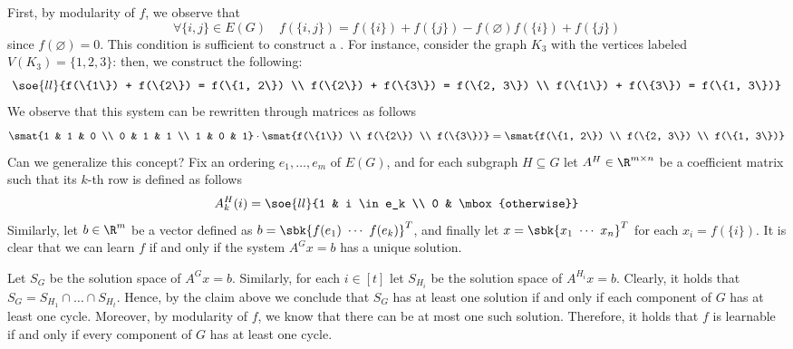 \documentclass[a4paper, 12pt]{report}
\begin{document}
{\begin{enumerate}
                First, by modularity of $f$, we observe that $$\forall \{i, j\} \in E(G) \quad f(\{i,j \}) = f(\{i\}) + f(\{j\}) - f(\varnothing)  f(\{i\}) + f(\{j\})$$ since $f(\varnothing) = 0$. This condition is sufficient to construct a . For instance, consider the graph $K_3$ with the vertices labeled $V(K_3) = \{1, 2, 3\}$: then, we construct the following: $$\soe{ll}{f(\{1\}) + f(\{2\}) = f(\{1, 2\}) \\ f(\{2\}) + f(\{3\}) = f(\{2, 3\}) \\ f(\{1\}) + f(\{3\}) = f(\{1, 3\})}$$ We observe that this system can be rewritten through matrices as follows $$\smat{1 & 1 & 0 \\ 0 & 1 & 1 \\ 1 & 0 & 1} \cdot \smat{f(\{1\}) \\ f(\{2\})  \\ f(\{3\})} = \smat{f(\{1, 2\}) \\ f(\{2, 3\}) \\ f(\{1, 3\})}$$ Can we generalize this concept? Fix an ordering $e_1, \ldots, e_m$ of $E(G)$, and for each subgraph $H \subseteq G$ let $A^H \in \R^{m \times n}$ be a coefficient matrix such that its $k$-th row is defined as follows $$A^H_k(i) = \soe{ll}{1 & i \in e_k \\ 0 & \mbox{otherwise}}$$ Similarly, let $b \in \R^m$ be a vector defined as $b = \sbk{f(e_1) \ \cdots \ f(e_k)}^T$, and finally let $x = \sbk{x_1 \ \cdots \ x_n}^T$ for each $x_i = f(\{i\})$. It is clear that we can learn $f$ if and only if the system $A^Gx = b$ has a unique solution.


                Let $S_G$ be the solution space of $A^Gx = b$. Similarly, for each $i \in [t]$ let $S_{H_i}$ be the solution space of $A^{H_i} x = b$. Clearly, it holds that $S_G = S_{H_1} \cap \ldots \cap S_{H_t}$. Hence, by the claim above we conclude that $S_G$ has at least one solution if and only if each component of $G$ has at least one cycle. Moreover, by modularity of $f$, we know that there can be at most one such solution. Therefore, it holds that $f$ is learnable if and only if every component of $G$ has at least one cycle.


\end{enumerate}}
\end{document}
